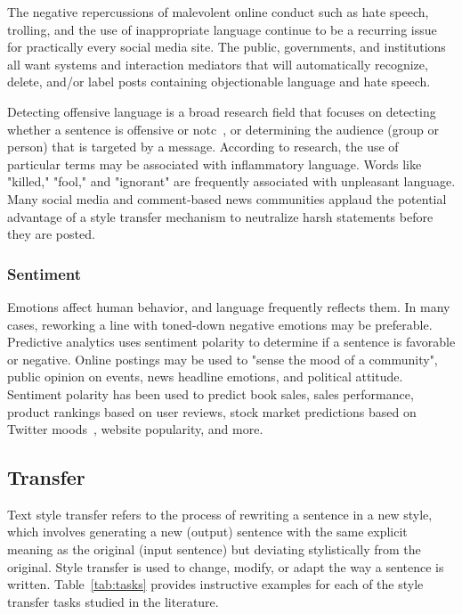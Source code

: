 \documentclass[akbc,twoside,11pt]{article}
\begin{document}
The negative repercussions of malevolent online conduct such as hate speech, trolling, and the use of inappropriate language continue to be a recurring issue for practically every social media site. The public, governments, and institutions all want systems and interaction mediators that will automatically recognize, delete, and/or label posts containing objectionable language and hate speech. 

Detecting offensive language is a broad research field that focuses on detecting whether a sentence is offensive or notc~\cite{pavlopoulos2019convai}, or determining the audience (group or person) that is targeted by a message. According to research, the use of particular terms may be associated with inflammatory language. Words like "killed," "fool," and "ignorant" are frequently associated with unpleasant language. Many social media and comment-based news communities applaud the potential advantage of a style transfer mechanism to neutralize harsh statements before they are posted.

\subsubsection{Sentiment}

Emotions affect human behavior, and language frequently reflects them. In many cases, reworking a line with toned-down negative emotions may be preferable. Predictive analytics uses sentiment polarity to determine if a sentence is favorable or negative. Online postings may be used to "sense the mood of a community", public opinion on events, news headline emotions, and political attitude. Sentiment polarity has been used to predict book sales, sales performance, product rankings based on user reviews, stock market predictions based on Twitter moods~\cite{bollen2011twitter}, website popularity, and more.

\subsection{Transfer}

Text style transfer refers to the process of rewriting a sentence in a new style, which involves generating a new (output) sentence with the same explicit meaning as the original (input sentence) but deviating stylistically from the original. Style transfer is used to change, modify, or adapt the way a sentence is written. Table~\ref{tab:tasks} provides instructive examples for each of the style transfer tasks studied in the literature.
\end{document}
